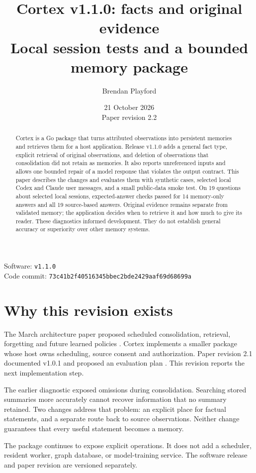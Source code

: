 \documentclass[11pt]{article}
\title{Cortex v1.1.0: facts and original evidence\\\large Local session tests and a bounded memory package}
\author{Brendan Playford}
\date{21 October 2026\\Paper revision 2.2}
\begin{document}
\maketitle
{\small Software: \texttt{v1.1.0}\\
Code commit: \texttt{73c41b2f40516345bbec2bde2429aaf69d68699a}}

\begin{abstract}
Cortex is a Go package that turns attributed observations into persistent memories and retrieves them for a host application. Release v1.1.0 adds a general fact type, explicit retrieval of original observations, and deletion of observations that consolidation did not retain as memories. It also reports unreferenced inputs and allows one bounded repair of a model response that violates the output contract. This paper describes the changes and evaluates them with synthetic cases, selected local Codex and Claude user messages, and a small public-data smoke test. On 19 questions about selected local sessions, expected-answer checks passed for 14 memory-only answers and all 19 source-based answers. Original evidence remains separate from validated memory; the application decides when to retrieve it and how much to give its reader. These diagnostics informed development. They do not establish general accuracy or superiority over other memory systems.
\end{abstract}

\section{Why this revision exists}
The March architecture paper proposed scheduled consolidation, retrieval, forgetting and future learned policies \cite{march}. Cortex implements a smaller package whose host owns scheduling, source consent and authorization. Paper revision 2.1 documented v1.0.1 and proposed an evaluation plan \cite{previous}. This revision reports the next implementation step.

The earlier diagnostic exposed omissions during consolidation. Searching stored summaries more accurately cannot recover information that no summary retained. Two changes address that problem: an explicit place for factual statements, and a separate route back to source observations. Neither change guarantees that every useful statement becomes a memory.

The package continues to expose explicit operations. It does not add a scheduler, resident worker, graph database, or model-training service. The software release and paper revision are versioned separately.
\end{document}
